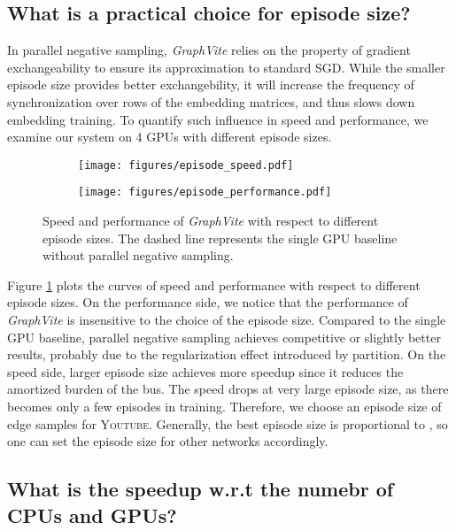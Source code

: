 \documentclass[sigconf]{acmart}
\newcommand{\dataset}[1]{\textsc{#1}\xspace}
\newcommand{\Graphy}{\textit{GraphVite}\xspace}
\begin{document}
\subsection{What is a practical choice for episode size?}
\label{sec:exchangeability}

In parallel negative sampling, \Graphy relies on the property of gradient exchangeability to ensure its approximation to standard SGD. While the smaller episode size provides better exchangebility, it will increase the frequency of synchronization over rows of the embedding matrices, and thus slows down embedding training. To quantify such influence in speed and performance, we examine our system on 4 GPUs with different episode sizes. 

\begin{figure}[!h]
    \centering
    \begin{subfigure}{0.23\textwidth}
        \texttt{[image: figures/episode\_speed.pdf]}
    \end{subfigure}
    \begin{subfigure}{0.23\textwidth}
        \texttt{[image: figures/episode\_performance.pdf]}
    \end{subfigure}
    \caption{Speed and performance of \Graphy with respect to different episode sizes. The dashed line represents the single GPU baseline without parallel negative sampling.}
    \label{fig:episode_size}
\end{figure}

Figure \ref{fig:episode_size} plots the curves of speed and performance with respect to different episode sizes. On the performance side, we notice that the performance of \Graphy is insensitive to the choice of the episode size. Compared to the single GPU baseline, parallel negative sampling achieves competitive or slightly better results, probably due to the regularization effect introduced by partition. On the speed side, larger episode size achieves more speedup since it reduces the amortized burden of the bus. The speed drops at very large episode size, as there becomes only a few episodes in training. Therefore, we choose an episode size of  edge samples for \dataset{Youtube}. Generally, the best episode size is proportional to , so one can set the episode size for other networks accordingly.

\subsection{What is the speedup w.r.t the numebr of CPUs and GPUs?}
\end{document}
